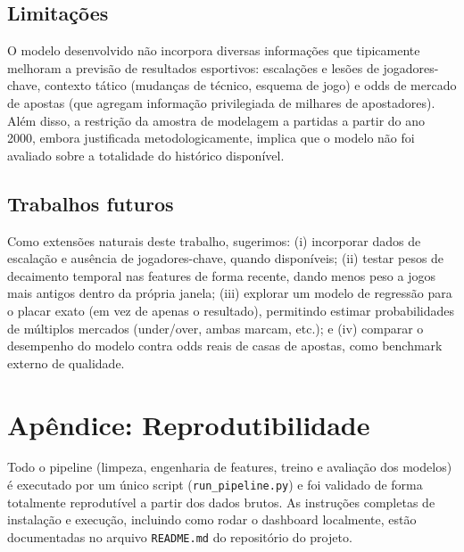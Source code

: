 \documentclass[12pt,a4paper]{article}
\begin{document}
\subsection{Limitações}

O modelo desenvolvido não incorpora diversas informações que tipicamente melhoram a previsão de resultados esportivos: escalações e lesões de jogadores-chave, contexto tático (mudanças de técnico, esquema de jogo) e odds de mercado de apostas (que agregam informação privilegiada de milhares de apostadores). Além disso, a restrição da amostra de modelagem a partidas a partir do ano 2000, embora justificada metodologicamente, implica que o modelo não foi avaliado sobre a totalidade do histórico disponível.

\subsection{Trabalhos futuros}

Como extensões naturais deste trabalho, sugerimos: (i) incorporar dados de escalação e ausência de jogadores-chave, quando disponíveis; (ii) testar pesos de decaimento temporal nas features de forma recente, dando menos peso a jogos mais antigos dentro da própria janela; (iii) explorar um modelo de regressão para o placar exato (em vez de apenas o resultado), permitindo estimar probabilidades de múltiplos mercados (under/over, ambas marcam, etc.); e (iv) comparar o desempenho do modelo contra odds reais de casas de apostas, como benchmark externo de qualidade.

\appendix
\section*{Apêndice: Reprodutibilidade}

Todo o pipeline (limpeza, engenharia de features, treino e avaliação dos modelos) é executado por um único script (\texttt{run\_pipeline.py}) e foi validado de forma totalmente reprodutível a partir dos dados brutos. As instruções completas de instalação e execução, incluindo como rodar o dashboard localmente, estão documentadas no arquivo \texttt{README.md} do repositório do projeto.
\end{document}
